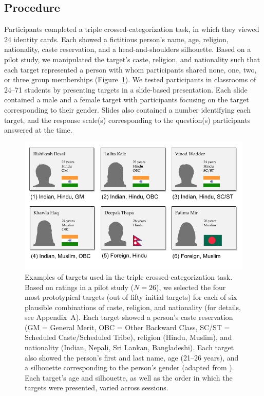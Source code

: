 \documentclass[12pt, a4paper]{article}
\begin{document}
\subsection{Procedure}

Participants completed a triple crossed-categorization task, in which they viewed 24 identity cards. Each showed a fictitious person's name, age, religion, nationality, caste reservation, and a head-and-shoulders silhouette. Based on a pilot study, we manipulated the target's caste, religion, and nationality such that each target represented a person with whom participants shared none, one, two, or three group memberships (Figure~\ref{fig:f2}). We tested participants in classrooms of 24--71 students by presenting targets in a slide-based presentation. Each slide contained a male and a female target with participants focusing on the target corresponding to their gender. Slides also contained a number identifying each target, and the response scale(s) corresponding to the question(s) participants answered at the time. 

\begin{figure}
\centering
\includegraphics[scale=1]{../figures/figure-2}
\caption{Examples of targets used in the triple crossed-categorization task. Based on ratings in a pilot study ($N = 26$), we selected the four most prototypical targets (out of fifty initial targets) for each of six plausible combinations of caste, religion, and nationality (for details, see Appendix~A). Each target showed a person's caste reservation (GM = General Merit, OBC = Other Backward Class, SC/ST = Scheduled Caste/Scheduled Tribe), religion (Hindu, Muslim), and nationality (Indian, Nepali, Sri Lankan, Bangladeshi). Each target also showed the person's first and last name, age (21--26 years), and a silhouette corresponding to the person's gender (adapted from \protect{}). Each target's age and silhouette, as well as the order in which the targets were presented, varied across sessions.}
\label{fig:f2}
\end{figure}
\end{document}
